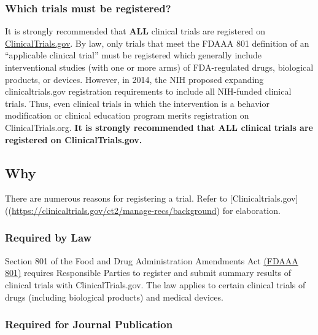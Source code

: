 \documentclass[]{book}
\theoremstyle{definition}
\theoremstyle{definition}
\theoremstyle{definition}
\theoremstyle{remark}
\begin{document}
\subsubsection{Which trials must be
registered?}\label{which-trials-must-be-registered}

It is strongly recommended that \textbf{ALL} clinical trials are
registered on \href{https://clinicaltrials.gov/}{ClinicalTrials.gov}. By
law, only trials that meet the FDAAA 801 definition of an ``applicable
clinical trial'' must be registered which generally include
interventional studies (with one or more arms) of FDA-regulated drugs,
biological products, or devices. However, in 2014, the NIH proposed
expanding clinicaltrials.gov registration requirements to include all
NIH-funded clinical trials. Thus, even clinical trials in which the
intervention is a behavior modification or clinical education program
merits registration on ClinicalTrials.org. \textbf{It is strongly
recommended that ALL clinical trials are registered on
ClinicalTrials.gov.}

\subsection{Why}\label{why-8}

There are numerous reasons for registering a trial. Refer to
{[}Clinicaltrials.gov{]}((\url{https://clinicaltrials.gov/ct2/manage-recs/background})
for elaboration.

\subsubsection{Required by Law}\label{required-by-law}

Section 801 of the Food and Drug Administration Amendments Act
\href{http://www.gpo.gov/fdsys/pkg/PLAW-110publ85/pdf/PLAW-110publ85.pdf\#page=82}{(FDAAA
801)} requires Responsible Parties to register and submit summary
results of clinical trials with ClinicalTrials.gov. The law applies to
certain clinical trials of drugs (including biological products) and
medical devices.

\subsubsection{Required for Journal
Publication}\label{required-for-journal-publication}
\end{document}
